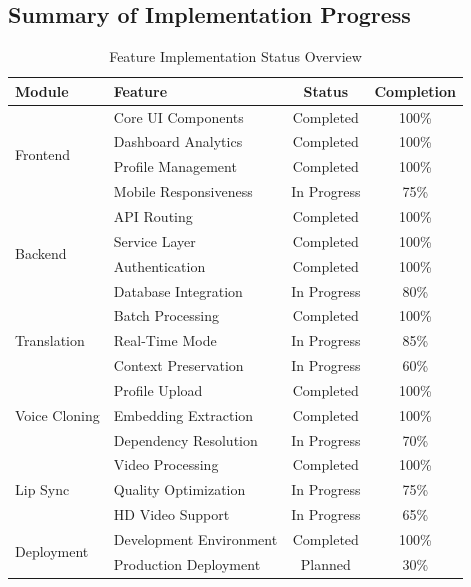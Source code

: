 \documentclass[12pt,oneside]{report}
\begin{document}
\subsection{Summary of Implementation Progress}

\begin{table}[H]
\centering
\caption{Feature Implementation Status Overview}
\label{tab:implementation-status}
\renewcommand{\arraystretch}{1.2}
\begin{tabular}{@{}llcc@{}}
\toprule
\textbf{Module} & \textbf{Feature} & \textbf{Status} & \textbf{Completion} \\
\midrule
\multirow{4}{*}{Frontend} 
    & Core UI Components & Completed & 100\% \\
    & Dashboard Analytics & Completed & 100\% \\
    & Profile Management & Completed & 100\% \\
    & Mobile Responsiveness & In Progress & 75\% \\
\midrule
\multirow{4}{*}{Backend} 
    & API Routing & Completed & 100\% \\
    & Service Layer & Completed & 100\% \\
    & Authentication & Completed & 100\% \\
    & Database Integration & In Progress & 80\% \\
\midrule
\multirow{3}{*}{Translation} 
    & Batch Processing & Completed & 100\% \\
    & Real-Time Mode & In Progress & 85\% \\
    & Context Preservation & In Progress & 60\% \\
\midrule
\multirow{3}{*}{Voice Cloning} 
    & Profile Upload & Completed & 100\% \\
    & Embedding Extraction & Completed & 100\% \\
    & Dependency Resolution & In Progress & 70\% \\
\midrule
\multirow{3}{*}{Lip Sync} 
    & Video Processing & Completed & 100\% \\
    & Quality Optimization & In Progress & 75\% \\
    & HD Video Support & In Progress & 65\% \\
\midrule
\multirow{2}{*}{Deployment} 
    & Development Environment & Completed & 100\% \\
    & Production Deployment & Planned & 30\% \\
\bottomrule
\end{tabular}
\end{table}
\end{document}
